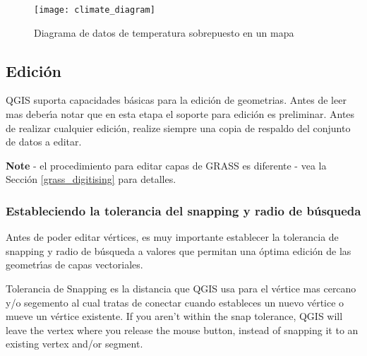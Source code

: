 \begin{figure}[ht]
   \begin{center}
   \caption{Diagrama de datos de temperatura sobrepuesto en un mapa \nixcaption}\label{fig:climatediagram}\smallskip
   \texttt{[image: climate\_diagram]}
\end{center}
\end{figure}

\subsection{Edici\'on}

QGIS suporta capacidades b\'asicas para la edici\'on de geometrias.  Antes de leer mas
deber\'{\i}a notar que en esta etapa el soporte para edici\'on es preliminar.
Antes de realizar cualquier edici\'on, realize siempre una copia de respaldo del conjunto de datos
a editar. 

\textbf{Note} - el procedimiento para editar capas de GRASS es diferente - vea la
Secci\'on \ref{grass_digitising} para detalles.

\subsubsection{Estableciendo la tolerancia del snapping y radio de b\'usqueda}

Antes de poder editar v\'ertices, es muy importante establecer la tolerancia
de snapping y radio de b\'usqueda a valores que permitan una \'optima edici\'on de
las geometr\'{\i}as de capas vectoriales. 


Tolerancia de Snapping es la distancia que QGIS usa para  el v\'ertice
mas cercano y/o segemento al cual tratas de conectar
cuando estableces un nuevo v\'ertice o mueve un v\'ertice existente. If you aren't
within the snap tolerance, QGIS will leave the vertex where you release the
mouse button, instead of snapping it to an existing vertex and/or segment. 

